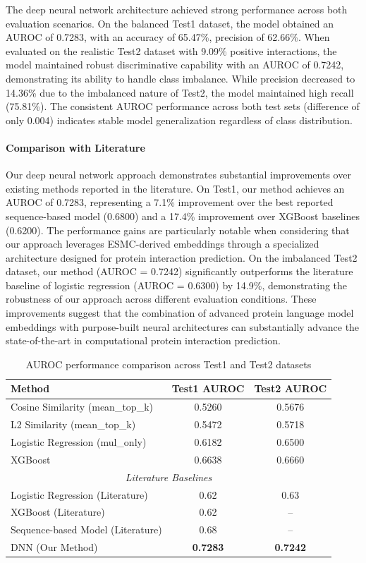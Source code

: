 \documentclass{article}
\begin{document}
The deep neural network architecture achieved strong performance across both evaluation scenarios. On the balanced Test1 dataset, the model obtained an AUROC of 0.7283, with an accuracy of 65.47\%, precision of 62.66\%. When evaluated on the realistic Test2 dataset with 9.09\% positive interactions, the model maintained robust discriminative capability with an AUROC of 0.7242, demonstrating its ability to handle class imbalance. While precision decreased to 14.36\% due to the imbalanced nature of Test2, the model maintained high recall (75.81\%). The consistent AUROC performance across both test sets (difference of only 0.004) indicates stable model generalization regardless of class distribution.

\paragraph{Comparison with Literature} Our deep neural network approach demonstrates substantial improvements over existing methods reported in the literature. On Test1, our method achieves an AUROC of 0.7283, representing a 7.1\% improvement over the best reported sequence-based model (0.6800) and a 17.4\% improvement over XGBoost baselines (0.6200). The performance gains are particularly notable when considering that our approach leverages ESMC-derived embeddings through a specialized architecture designed for protein interaction prediction. On the imbalanced Test2 dataset, our method (AUROC = 0.7242) significantly outperforms the literature baseline of logistic regression (AUROC = 0.6300) by 14.9\%, demonstrating the robustness of our approach across different evaluation conditions. These improvements suggest that the combination of advanced protein language model embeddings with purpose-built neural architectures can substantially advance the state-of-the-art in computational protein interaction prediction.



\begin{table}[h]
\caption{AUROC performance comparison across Test1 and Test2 datasets}
\label{tab:results}
\centering
\begin{tabular}{lcc}
\toprule
\textbf{Method} & \textbf{Test1 AUROC} & \textbf{Test2 AUROC}\\
\midrule
Cosine Similarity (mean\_top\_k) & 0.5260 & 0.5676\\
L2 Similarity (mean\_top\_k) & 0.5472 & 0.5718\\
Logistic Regression (mul\_only) & 0.6182 & 0.6500\\
XGBoost & 0.6638 & 0.6660\\
\midrule
\multicolumn{3}{c}{\textit{Literature Baselines}}\\
\midrule
Logistic Regression (Literature) & 0.62 & 0.63\\
XGBoost (Literature) & 0.62 & --\\
Sequence-based Model (Literature) & 0.68 & --\\
\midrule
DNN (Our Method) & \textbf{0.7283} & \textbf{0.7242}\\
\bottomrule
\end{tabular}
\end{table}
\end{document}
